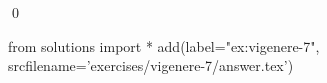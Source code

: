 
\begin{ex} 
  \label{ex:vigenere-7}
  
  \qed
\end{ex} 
\begin{python0}
from solutions import *
add(label="ex:vigenere-7",
    srcfilename='exercises/vigenere-7/answer.tex') 
\end{python0}
